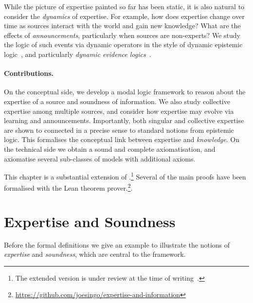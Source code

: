 While the picture of expertise painted so far has been static, it is also
natural to consider the \emph{dynamics} of expertise. For example, how does
expertise change over time as sources interact with the world and gain new
knowledge? What are the effects of \emph{announcements}, particularly when
sources are non-experts? We study the logic of such events via dynamic
operators in the style of dynamic epistemic
logic~\cite{van_Ditmarsch_2008}, and particularly \emph{dynamic evidence
logics}~\cite{van2011dynamic,vanbenthem2014106}.

\paragraph{Contributions.} On the conceptual side, we develop a modal logic
framework to reason about the expertise of a source and soundness of
information. We also study collective expertise among multiple sources, and
consider how expertise may evolve via learning and announcements. Importantly,
both singular and collective expertise are shown to connected in a precise
sense to standard notions from epistemic logic. This formalises the conceptual
link between expertise and \emph{knowledge}.
%
On the technical side we obtain a sound and complete axiomatisation, and
axiomatise several sub-classes of models with additional axioms.

This chapter is a substantial extension of
\textcite{singleton2021logic}.\footnote{The extended version is under review at
the time of writing~\cite{singleton2022expetise}.} Several of the main proofs
have been formalised with the Lean theorem
prover.\footnote{\url{https://github.com/joesingo/expertise-and-information}}.

\section{Expertise and Soundness}
\label{exp_sec_expertise_and_soundness}

Before the formal definitions we give an example to illustrate the notions of
\emph{expertise} and \emph{soundness}, which are central to the framework.

